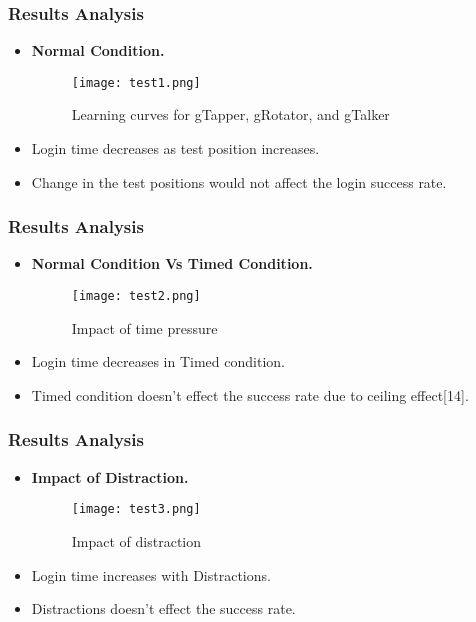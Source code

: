 \documentclass{beamer}
\begin{document}
\begin{frame}
\frametitle{Results Analysis}

\begin{itemize}
\justifying
    
    \item \textbf{Normal Condition.}
    \begin{figure}
    \begin{center}
        \texttt{[image: test1.png]}
        \caption{Learning curves for gTapper, gRotator, and gTalker}
    \end{center}
\end{figure}    


    \item Login time decreases as test position increases.
    \item Change in the test positions would not affect the login success rate.

\end{itemize}


\end{frame}

\begin{frame}
\frametitle{Results Analysis}

\begin{itemize}
\justifying
    
    \item \textbf{Normal Condition Vs Timed Condition.}
    \begin{figure}
    \begin{center}
        \texttt{[image: test2.png]}
        \caption{Impact of time pressure}
    \end{center}
\end{figure}    


    \item Login time decreases in Timed condition.
    \item Timed condition doesn't effect the success rate due to ceiling effect[14].

\end{itemize}


\end{frame}

\begin{frame}
\frametitle{Results Analysis}

\begin{itemize}
\justifying
    
    \item \textbf{Impact of Distraction.}
    \begin{figure}
    \begin{center}
        \texttt{[image: test3.png]}
        \caption{Impact of distraction}
    \end{center}
\end{figure}    


    \item Login time increases with Distractions.
    \item Distractions doesn't effect the success rate.

\end{itemize}


\end{frame}
\end{document}
